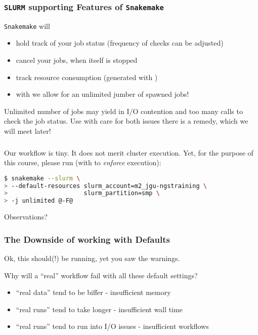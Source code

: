 \begin{frame}[fragile]
  \frametitle{\texttt{SLURM} supporting Features of \texttt{Snakemake}}
  \texttt{Snakemake} will
  \begin{itemize}[<+->]
   \item hold track of your job status (frequency of checks can be adjusted)
   \item cancel your jobs, when itself is stopped
   \item track resource consumption (generated with )
   \item with  we allow for an unlimited jumber of spawned jobs!
  \end{itemize}
  \pause
  \begin{warning}
  	Unlimited number of jobs may yield in I/O contention and too many calls to check the job status. Use with care for both issues there is a remedy, which we will meet later!
  \end{warning}
\end{frame}

\begin{frame}[fragile]
  \frametitle{}
  Our workflow is {\tiny tiny}. It does not merit cluster execution. Yet, for the purpose of this course, please run (with  to \emph{enforce} execution):
  \begin{lstlisting}[language=Bash, style=Shell, basicstyle=\footnotesize]
$ snakemake --slurm \
> --default-resources slurm_account=m2_jgu-ngstraining \
>                     slurm_partition=smp \
> -j unlimited @-F@
  \end{lstlisting}
  \begin{question}
  	Observations?
  \end{question}
\end{frame}

\begin{frame}
  \frametitle{The Downside of working with Defaults}
  Ok, this should(!) be running, yet you saw the warnings. 
  \begin{question}
  	Why will a ``real'' workflow fail with all these default settings?
  \end{question}
  \pause
  \begin{itemize}
   \item ``real data'' tend to be biffer - insufficient memory
   \item ``real runs'' tend to take longer - insufficient wall time
   \item ``real runs'' tend to run into I/O issues - insufficient workflows
  \end{itemize}
\end{frame}


